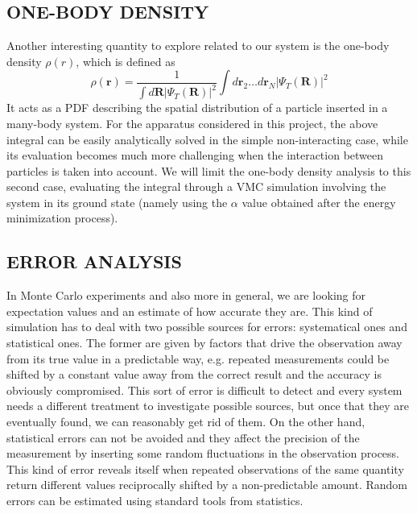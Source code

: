 \subsection{ONE-BODY DENSITY}
Another interesting quantity to explore related to our system is the one-body density $\rho(r)$, which is defined as
\begin{equation*}
    \rho(\bm{r}) = \frac{1}{\int d\bm{R} \vert \Psi_T(\bm{R}) \vert^2} \int d\bm{r}_2 \dots d\bm{r}_N \vert \Psi_T(\bm{R}) \vert^2
\end{equation*}
It acts as a PDF describing the spatial distribution of a particle inserted in a many-body system. For the apparatus considered in this project, the above integral can be easily analytically solved in the simple non-interacting case, while its evaluation becomes much more challenging when the interaction between particles is taken into account. We will limit the one-body density analysis to this second case, evaluating the integral through a VMC simulation involving the system in its ground state (namely using the $\alpha$ value obtained after the energy minimization process). 



\subsection{ERROR ANALYSIS} \label{sec:error analysis}
In Monte Carlo experiments and also more in general, we are looking for expectation values and an estimate of how accurate they are. This kind of simulation has to deal with two possible sources for errors: systematical ones and statistical ones. The former are given by factors that drive the observation away from its true value in a predictable way, e.g. repeated measurements could be shifted by a constant value away from the correct result and the accuracy is obviously compromised. This sort of error is difficult to detect and every system needs a different treatment to investigate possible sources, but once that they are eventually found, we can reasonably get rid of them. On the other hand, statistical errors can not be avoided and they affect the precision of the measurement by inserting some random fluctuations in the observation process. This kind of error reveals itself when repeated observations of the same quantity return different values reciprocally shifted by a non-predictable amount. Random errors can be estimated using standard tools from statistics.

